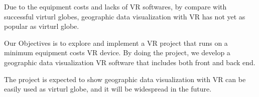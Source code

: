 Due to the equipment costs and lacks of VR softwares, by compare with successful virturl globes, geographic data visualization with VR has not yet as popular as virturl globe. 

Our Objectives is to explore and implement a VR project that runs on a minimum equipment costs VR device. By doing the project, we develop a geographic data visualization VR software that includes both front and back end.

The project is expected to show geographic data visualization with VR can be easily used as virturl globe, and it will be widespread in the future.

